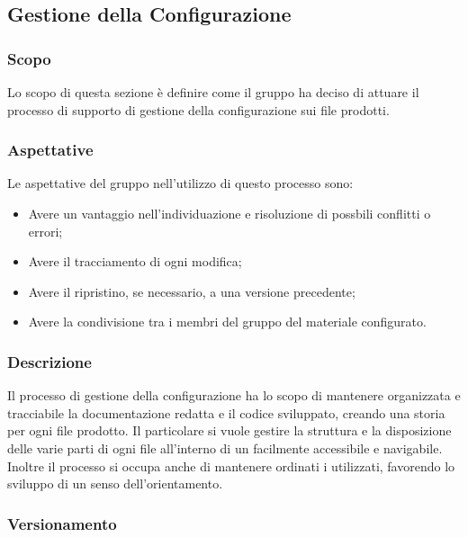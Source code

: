 \subsection{Gestione della Configurazione}
\subsubsection{Scopo}
Lo scopo di questa sezione è definire come il gruppo ha deciso di attuare il processo di supporto di gestione della configurazione sui file prodotti.

\subsubsection{Aspettative}
Le aspettative del gruppo \Gruppo{} nell'utilizzo di questo processo sono:
\begin{itemize}
	\item Avere un vantaggio nell'individuazione e risoluzione di possbili conflitti o errori;
	\item Avere il tracciamento di ogni modifica;
	\item Avere il ripristino, se necessario, a una versione precedente;
	\item Avere la condivisione tra i membri del gruppo del materiale configurato.
\end{itemize}

\subsubsection{Descrizione}
Il processo di gestione della configurazione ha lo scopo di mantenere organizzata e tracciabile la documentazione redatta e il codice sviluppato, creando una storia per ogni file prodotto. Il particolare si vuole gestire la struttura e la disposizione delle varie parti di ogni file all'interno di un  facilmente accessibile e navigabile.
Inoltre il processo si occupa anche di mantenere ordinati i  utilizzati, favorendo lo sviluppo di un senso dell'orientamento.

\subsubsection{Versionamento}
